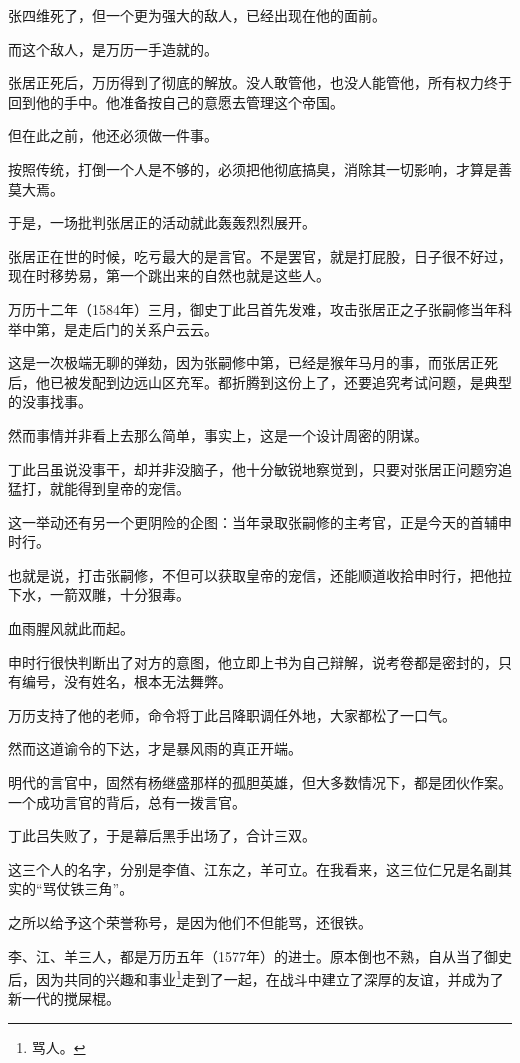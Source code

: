 \begin{multicols}{\theparacolNo}
张四维死了，但一个更为强大的敌人，已经出现在他的面前。

而这个敌人，是万历一手造就的。

张居正死后，万历得到了彻底的解放。没人敢管他，也没人能管他，所有权力终于回到他的手中。他准备按自己的意愿去管理这个帝国。

但在此之前，他还必须做一件事。

按照传统，打倒一个人是不够的，必须把他彻底搞臭，消除其一切影响，才算是善莫大焉。

于是，一场批判张居正的活动就此轰轰烈烈展开。

张居正在世的时候，吃亏最大的是言官。不是罢官，就是打屁股，日子很不好过，现在时移势易，第一个跳出来的自然也就是这些人。

万历十二年（1584年）三月，御史丁此吕首先发难，攻击张居正之子张嗣修当年科举中第，是走后门的关系户云云。

这是一次极端无聊的弹劾，因为张嗣修中第，已经是猴年马月的事，而张居正死后，他已被发配到边远山区充军。都折腾到这份上了，还要追究考试问题，是典型的没事找事。

然而事情并非看上去那么简单，事实上，这是一个设计周密的阴谋。

丁此吕虽说没事干，却并非没脑子，他十分敏锐地察觉到，只要对张居正问题穷追猛打，就能得到皇帝的宠信。

这一举动还有另一个更阴险的企图：当年录取张嗣修的主考官，正是今天的首辅申时行。

也就是说，打击张嗣修，不但可以获取皇帝的宠信，还能顺道收拾申时行，把他拉下水，一箭双雕，十分狠毒。

血雨腥风就此而起。

申时行很快判断出了对方的意图，他立即上书为自己辩解，说考卷都是密封的，只有编号，没有姓名，根本无法舞弊。

万历支持了他的老师，命令将丁此吕降职调任外地，大家都松了一口气。

然而这道谕令的下达，才是暴风雨的真正开端。

明代的言官中，固然有杨继盛那样的孤胆英雄，但大多数情况下，都是团伙作案。一个成功言官的背后，总有一拨言官。

丁此吕失败了，于是幕后黑手出场了，合计三双。

这三个人的名字，分别是李值、江东之，羊可立。在我看来，这三位仁兄是名副其实的“骂仗铁三角”。

之所以给予这个荣誉称号，是因为他们不但能骂，还很铁。

李、江、羊三人，都是万历五年（1577年）的进士。原本倒也不熟，自从当了御史后，因为共同的兴趣和事业\footnote{骂人。}走到了一起，在战斗中建立了深厚的友谊，并成为了新一代的搅屎棍。


\end{multicols}
